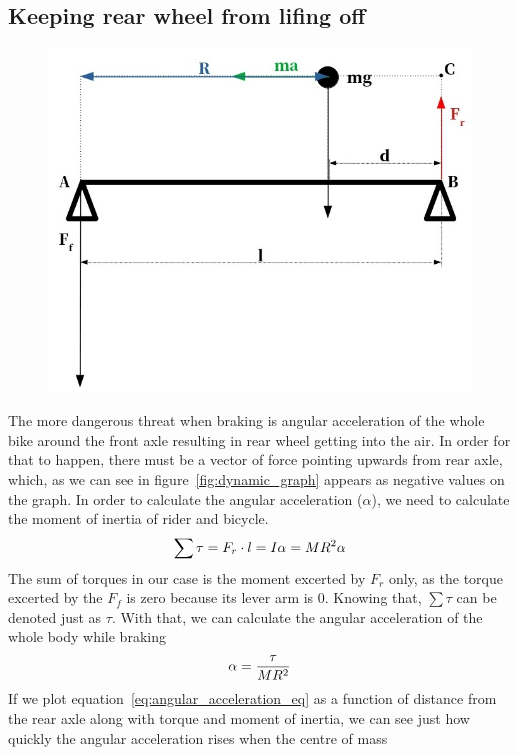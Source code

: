 \documentclass[12pt]{article}
\begin{document}
\subsection{Keeping rear wheel from lifing off}
\begin{figure}[H]
\caption{}
\centering%
\label{fig:angular_acceleration_figure}
\includegraphics[width=0.8\linewidth]{angular_acceleration_diagram}%
\end{figure}
The more dangerous threat when braking is angular acceleration of the whole bike around the front axle resulting
in rear wheel getting into the air. In order for that to happen, there must be a vector of force pointing upwards
from rear axle, which, as we can see in figure~\ref{fig:dynamic_graph} appears as negative values on the graph.
In order to calculate the angular acceleration ($\alpha$), we need to calculate the moment of inertia of rider 
and bicycle.
\begin{equation}
\centering%
\label{eq:moment_of_inertia}
\sum \tau = F_r \cdot l =  I\alpha = MR^2\alpha
\end{equation}
The sum of torques in our case is the moment excerted by $F_r$ only, as the torque excerted by the $F_f$ is 
zero because its lever arm is 0. Knowing that, $\sum \tau$ can be denoted just as $\tau$. With that, we can
calculate the angular acceleration of the whole body while braking
\begin{equation}
\centering%
\label{eq:angular_acceleration_eq}
\alpha = \frac{\tau}{MR^2}
\end{equation}
If we plot equation~\ref{eq:angular_acceleration_eq} as a function of distance from the rear axle along with 
torque and moment of inertia, we can see just how quickly the angular acceleration rises when the centre of mass
\end{document}
